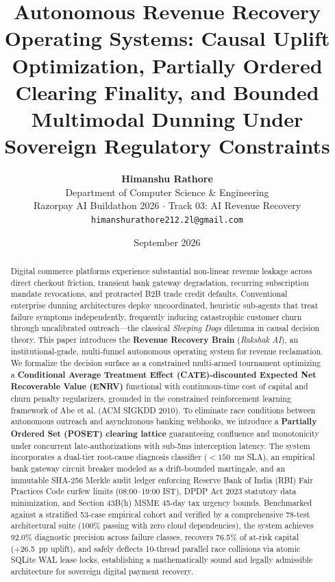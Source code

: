 \documentclass[10pt, twocolumn, a4paper]{article}
\begin{document}
\title{\LARGE \textbf{Autonomous Revenue Recovery Operating Systems: Causal Uplift Optimization, Partially Ordered Clearing Finality, and Bounded Multimodal Dunning Under Sovereign Regulatory Constraints}}

\author{
  \textbf{Himanshu Rathore} \\
  \small Department of Computer Science \& Engineering \\
  \small Razorpay AI Buildathon 2026 $\cdot$ Track 03: AI Revenue Recovery \\
  \small \texttt{himanshurathore212.2l@gmail.com}
}

\date{\small September 2026}

\maketitle

\begin{abstract}
Digital commerce platforms experience substantial non-linear revenue leakage across direct checkout friction, transient bank gateway degradation, recurring subscription mandate revocations, and protracted B2B trade credit defaults. Conventional enterprise dunning architectures deploy uncoordinated, heuristic sub-agents that treat failure symptoms independently, frequently inducing catastrophic customer churn through uncalibrated outreach---the classical \textit{Sleeping Dogs} dilemma in causal decision theory. This paper introduces the \textbf{Revenue Recovery Brain} (\textit{Rakshak AI}), an institutional-grade, multi-funnel autonomous operating system for revenue reclamation. We formalize the decision surface as a constrained multi-armed tournament optimizing a \textbf{Conditional Average Treatment Effect (CATE)-discounted Expected Net Recoverable Value (ENRV)} functional with continuous-time cost of capital and churn penalty regularizers, grounded in the constrained reinforcement learning framework of Abe et al. (ACM SIGKDD 2010). To eliminate race conditions between autonomous outreach and asynchronous banking webhooks, we introduce a \textbf{Partially Ordered Set (POSET) clearing lattice} guaranteeing confluence and monotonicity under concurrent late-authorizations with sub-5ms interception latency. The system incorporates a dual-tier root-cause diagnosis classifier ($<150$~ms SLA), an empirical bank gateway circuit breaker modeled as a drift-bounded martingale, and an immutable SHA-256 Merkle audit ledger enforcing Reserve Bank of India (RBI) Fair Practices Code curfew limits (08:00--19:00 IST), DPDP Act 2023 statutory data minimization, and Section 43B(h) MSME 45-day tax urgency bounds. Benchmarked against a stratified 53-case empirical cohort and verified by a comprehensive 78-test architectural suite (100\% passing with zero cloud dependencies), the system achieves 92.0\% diagnostic precision across failure classes, recovers 76.5\% of at-risk capital (+26.5~pp uplift), and safely deflects 10-thread parallel race collisions via atomic SQLite WAL lease locks, establishing a mathematically sound and legally admissible architecture for sovereign digital payment recovery.
\end{abstract}
\end{document}
